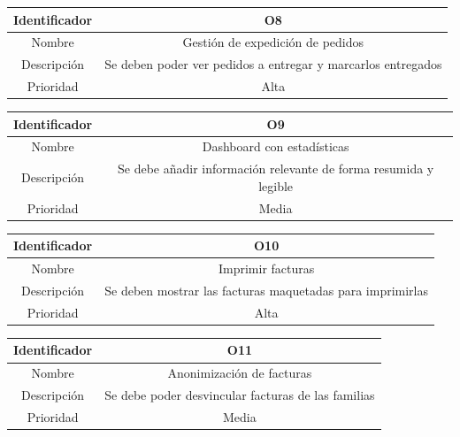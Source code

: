 \vspace{1em}
\par
\begin{tabular}{||c|c||} 
\hline
Identificador & O8 \\ [0.5ex] 
\hline\hline
Nombre & Gestión de expedición de pedidos \\ 
\hline
Descripción & Se deben poder ver pedidos a entregar y marcarlos entregados \\
\hline
Prioridad & Alta \\ [1ex] 
\hline
\end{tabular}


\vspace{1em}
\par
\begin{tabular}{||c|c||} 
\hline
Identificador & O9 \\ [0.5ex] 
\hline\hline
Nombre & Dashboard con estadísticas \\ 
\hline
Descripción & Se debe añadir información relevante de forma resumida y legible \\
\hline
Prioridad & Media \\ [1ex] 
\hline
\end{tabular}


\vspace{1em}
\par
\begin{tabular}{||c|c||} 
\hline
Identificador & O10 \\ [0.5ex] 
\hline\hline
Nombre & Imprimir facturas \\ 
\hline
Descripción & Se deben mostrar las facturas maquetadas para imprimirlas \\
\hline
Prioridad & Alta \\ [1ex] 
\hline
\end{tabular}


\vspace{1em}
\par
\begin{tabular}{||c|c||} 
\hline
Identificador & O11 \\ [0.5ex] 
\hline\hline
Nombre & Anonimización de facturas \\ 
\hline
Descripción & Se debe poder desvincular facturas de las familias \\
\hline
Prioridad & Media \\ [1ex] 
\hline
\end{tabular}


